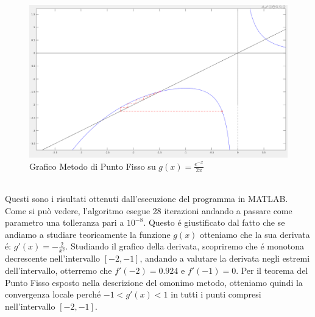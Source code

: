 \documentclass[12pt, letterpaper]{article}
\begin{document}
\begin{figure}[ht!]
    \includegraphics[scale=0.4]{EsponenzialePuntoFisso.png}
    \caption{Grafico Metodo di Punto Fisso su $g(x)=\frac{e^{-x}}{2x}$}
\end{figure} \\


Questi sono i risultati ottenuti dall'esecuzione del programma in MATLAB.\\ Come si può vedere, l'algoritmo esegue 28 iterazioni andando a passare come parametro una tolleranza pari a $10^{-8}$.
Questo \'e giustificato dal fatto che se andiamo a studiare teoricamente la funzione $g(x)$ otteniamo che la sua derivata \'e: $g'(x)=-\frac{2}{x^2}$. 
Studiando il grafico della derivata, scopriremo che \'e monotona decrescente nell'intervallo $[-2,-1]$, andando a valutare la derivata negli estremi dell'intervallo, otterremo che $f'(-2)=0.924$ e $f'(-1)=0$.
Per il teorema del Punto Fisso esposto nella descrizione del omonimo metodo, otteniamo quindi la convergenza locale perch\'e $-1<g'(x)<1$ in tutti i punti compresi nell'intervallo $[-2,-1]$.
\end{document}
